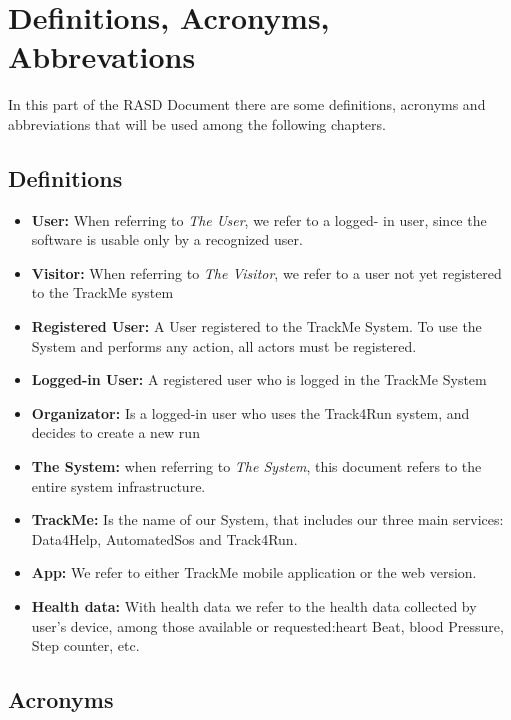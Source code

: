 \section{Definitions, Acronyms, Abbrevations}
In this part of the RASD Document there are some definitions, acronyms and abbreviations that will be used among the following chapters.
\subsection{Definitions}
\begin{itemize}
\item \textbf{User:} When referring to \emph{The User}, we refer to a logged- in user, since the software is usable only by a recognized user. 

\item \textbf{Visitor:} When referring to \emph{The Visitor}, we refer to a user not yet registered to the TrackMe system

\item \textbf{Registered User:} A User registered to the TrackMe System. To use the System and performs any action, all actors must be registered. 

\item\textbf{Logged-in User:} A registered user who is logged in the TrackMe System

\item\textbf{Organizator:} Is a logged-in  user who uses the Track4Run system, and decides to create a new run
\item \textbf{The System:} when referring to \emph{The System}, this document refers to the entire system infrastructure.
\item\textbf{TrackMe:}
Is the name of our System, that  includes our three main services: Data4Help, AutomatedSos and Track4Run.
\item\textbf{App:} We refer to either TrackMe mobile application or the web version.

\item\textbf{Health data:} With health data we refer to the health data collected by user's device, among those available or requested:heart Beat, blood Pressure, Step counter, etc. 



	
	\end{itemize}
\subsection{Acronyms}

